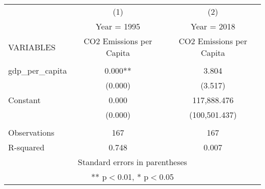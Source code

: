 \begin{tabular}{lcc} \hline
 & (1) & (2) \\
 & Year = 1995 & Year = 2018 \\
VARIABLES & CO2 Emissions per Capita & CO2 Emissions per Capita \\ \hline
 &  &  \\
gdp\_per\_capita & 0.000** & 3.804 \\
 & (0.000) & (3.517) \\
Constant & 0.000 & 117,888.476 \\
 & (0.000) & (100,501.437) \\
 &  &  \\
Observations & 167 & 167 \\
 R-squared & 0.748 & 0.007 \\ \hline
\multicolumn{3}{c}{ Standard errors in parentheses} \\
\multicolumn{3}{c}{ ** p$<$0.01, * p$<$0.05} \\
\end{tabular}
